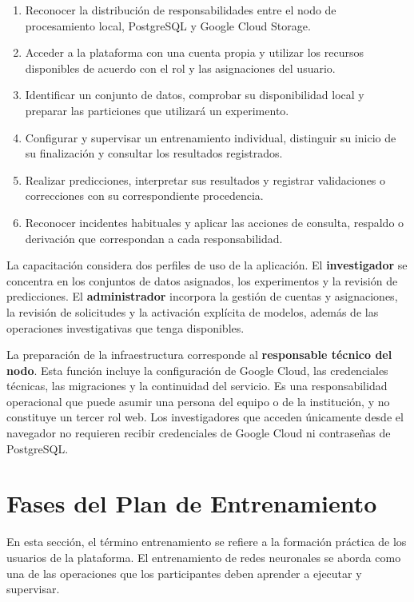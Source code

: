 \begin{enumerate}
    \item Reconocer la distribución de responsabilidades entre el nodo de
    procesamiento local, PostgreSQL y Google Cloud Storage.
    \item Acceder a la plataforma con una cuenta propia y utilizar los recursos
    disponibles de acuerdo con el rol y las asignaciones del usuario.
    \item Identificar un conjunto de datos, comprobar su disponibilidad local y
    preparar las particiones que utilizará un experimento.
    \item Configurar y supervisar un entrenamiento individual, distinguir su
    inicio de su finalización y consultar los resultados registrados.
    \item Realizar predicciones, interpretar sus resultados y registrar
    validaciones o correcciones con su correspondiente procedencia.
    \item Reconocer incidentes habituales y aplicar las acciones de consulta,
    respaldo o derivación que correspondan a cada responsabilidad.
\end{enumerate}

La capacitación considera dos perfiles de uso de la aplicación. El
\textbf{investigador} se concentra en los conjuntos de datos asignados, los
experimentos y la revisión de predicciones. El \textbf{administrador} incorpora
la gestión de cuentas y asignaciones, la revisión de solicitudes y la
activación explícita de modelos, además de las operaciones investigativas que
tenga disponibles.

La preparación de la infraestructura corresponde al \textbf{responsable
técnico del nodo}. Esta función incluye la configuración de Google Cloud, las
credenciales técnicas, las migraciones y la continuidad del servicio. Es una
responsabilidad operacional que puede asumir una persona del equipo o de la
institución, y no constituye un tercer rol web. Los investigadores que acceden
únicamente desde el navegador no requieren recibir credenciales de Google
Cloud ni contraseñas de PostgreSQL.

\section{Fases del Plan de Entrenamiento}
\label{sec:fases-entrenamiento-usuarios}

En esta sección, el término entrenamiento se refiere a la formación práctica de
los usuarios de la plataforma. El entrenamiento de redes neuronales se aborda
como una de las operaciones que los participantes deben aprender a ejecutar y
supervisar.

